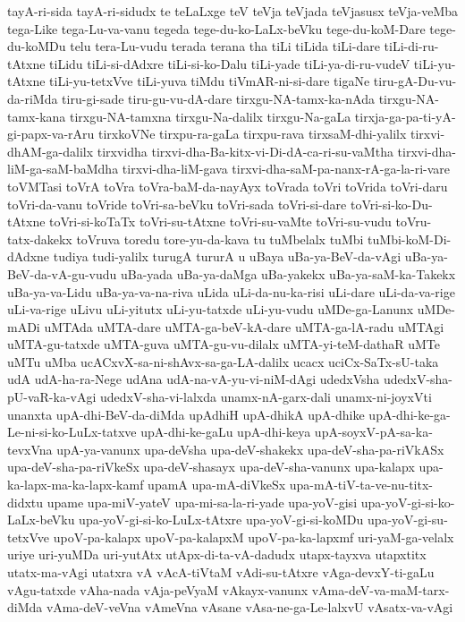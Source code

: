 {tayA-ri-sida
tayA-ri-sidudx
te
teLaLxge
teV
teVja
teVjada
teVjasusx
teVja-veMba
tega-Like
tega-Lu-va-vanu
tegeda
tege-du-ko-LaLx-beVku
tege-du-koM-Dare
tege-du-koMDu
telu
tera-Lu-vudu
terada
terana
tha
tiLi
tiLida
tiLi-dare
tiLi-di-ru-tAtxne
tiLidu
tiLi-si-dAdxre
tiLi-si-ko-Dalu
tiLi-yade
tiLi-ya-di-ru-vudeV
tiLi-yu-tAtxne
tiLi-yu-tetxVve
tiLi-yuva
tiMdu
tiVmAR-ni-si-dare
tigaNe
tiru-gA-Du-vu-da-riMda
tiru-gi-sade
tiru-gu-vu-dA-dare
tirxgu-NA-tamx-ka-nAda
tirxgu-NA-tamx-kana
tirxgu-NA-tamxna
tirxgu-Na-dalilx
tirxgu-Na-gaLa
tirxja-ga-pa-ti-yA-gi-papx-va-rAru
tirxkoVNe
tirxpu-ra-gaLa
tirxpu-rava
tirxsaM-dhi-yalilx
tirxvi-dhAM-ga-dalilx
tirxvidha
tirxvi-dha-Ba-kitx-vi-Di-dA-ca-ri-su-vaMtha
tirxvi-dha-liM-ga-saM-baMdha
tirxvi-dha-liM-gava
tirxvi-dha-saM-pa-nanx-rA-ga-la-ri-vare
toVMTasi
toVrA
toVra
toVra-baM-da-nayAyx
toVrada
toVri
toVrida
toVri-daru
toVri-da-vanu
toVride
toVri-sa-beVku
toVri-sada
toVri-si-dare
toVri-si-ko-Du-tAtxne
toVri-si-koTaTx
toVri-su-tAtxne
toVri-su-vaMte
toVri-su-vudu
toVru-tatx-dakekx
toVruva
toredu
tore-yu-da-kava
tu
tuMbelalx
tuMbi
tuMbi-koM-Di-dAdxne
tudiya
tudi-yalilx
turugA
tururA
u
uBaya
uBa-ya-BeV-da-vAgi
uBa-ya-BeV-da-vA-gu-vudu
uBa-yada
uBa-ya-daMga
uBa-yakekx
uBa-ya-saM-ka-Takekx
uBa-ya-va-Lidu
uBa-ya-va-na-riva
uLida
uLi-da-nu-ka-risi
uLi-dare
uLi-da-va-rige
uLi-va-rige
uLivu
uLi-yitutx
uLi-yu-tatxde
uLi-yu-vudu
uMDe-ga-Lanunx
uMDe-mADi
uMTAda
uMTA-dare
uMTA-ga-beV-kA-dare
uMTA-ga-lA-radu
uMTAgi
uMTA-gu-tatxde
uMTA-guva
uMTA-gu-vu-dilalx
uMTA-yi-teM-dathaR
uMTe
uMTu
uMba
ucACxvX-sa-ni-shAvx-sa-ga-LA-dalilx
ucacx
uciCx-SaTx-sU-taka
udA
udA-ha-ra-Nege
udAna
udA-na-vA-yu-vi-niM-dAgi
udedxVsha
udedxV-sha-pU-vaR-ka-vAgi
udedxV-sha-vi-lalxda
unamx-nA-garx-dali
unamx-ni-joyxVti
unanxta
upA-dhi-BeV-da-diMda
upAdhiH
upA-dhikA
upA-dhike
upA-dhi-ke-ga-Le-ni-si-ko-LuLx-tatxve
upA-dhi-ke-gaLu
upA-dhi-keya
upA-soyxV-pA-sa-ka-tevxVna
upA-ya-vanunx
upa-deVsha
upa-deV-shakekx
upa-deV-sha-pa-riVkASx
upa-deV-sha-pa-riVkeSx
upa-deV-shasayx
upa-deV-sha-vanunx
upa-kalapx
upa-ka-lapx-ma-ka-lapx-kamf
upamA
upa-mA-diVkeSx
upa-mA-tiV-ta-ve-nu-titx-didxtu
upame
upa-miV-yateV
upa-mi-sa-la-ri-yade
upa-yoV-gisi
upa-yoV-gi-si-ko-LaLx-beVku
upa-yoV-gi-si-ko-LuLx-tAtxre
upa-yoV-gi-si-koMDu
upa-yoV-gi-su-tetxVve
upoV-pa-kalapx
upoV-pa-kalapxM
upoV-pa-ka-lapxmf
uri-yaM-ga-velalx
uriye
uri-yuMDa
uri-yutAtx
utApx-di-ta-vA-dadudx
utapx-tayxva
utapxtitx
utatx-ma-vAgi
utatxra
vA
vAcA-tiVtaM
vAdi-su-tAtxre
vAga-devxY-ti-gaLu
vAgu-tatxde
vAha-nada
vAja-peVyaM
vAkayx-vanunx
vAma-deV-va-maM-tarx-diMda
vAma-deV-veVna
vAmeVna
vAsane
vAsa-ne-ga-Le-lalxvU
vAsatx-va-vAgi
}
